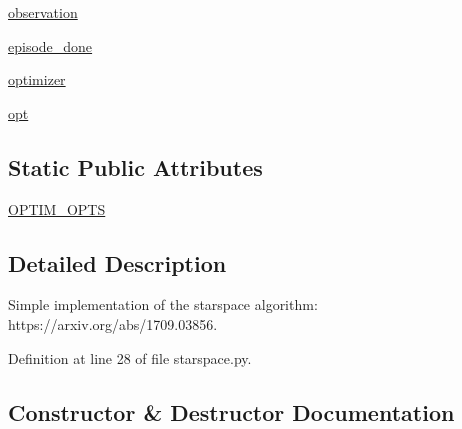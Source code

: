 \begin{DoxyCompactItemize}
\item 
\hyperlink{classparlai_1_1agents_1_1starspace_1_1starspace_1_1StarspaceAgent_a0ec7b24305a7ca5f0fd5a11cd6aa1fdc}{observation}
\item 
\hyperlink{classparlai_1_1agents_1_1starspace_1_1starspace_1_1StarspaceAgent_ad6565ef570b709afb46bf9a9b4bc59c3}{episode\+\_\+done}
\item 
\hyperlink{classparlai_1_1agents_1_1starspace_1_1starspace_1_1StarspaceAgent_afacbbd91785631f9b23fd0fbd9b4cc21}{optimizer}
\item 
\hyperlink{classparlai_1_1agents_1_1starspace_1_1starspace_1_1StarspaceAgent_aae476e9cdd8b9672ae6c28ef9400f09e}{opt}
\end{DoxyCompactItemize}
\subsection*{Static Public Attributes}
\begin{DoxyCompactItemize}
\item 
\hyperlink{classparlai_1_1agents_1_1starspace_1_1starspace_1_1StarspaceAgent_a7a9de321f7be5793fb4d0fdb4892b9dc}{O\+P\+T\+I\+M\+\_\+\+O\+P\+TS}
\end{DoxyCompactItemize}


\subsection{Detailed Description}
\begin{DoxyVerb}Simple implementation of the starspace algorithm: https://arxiv.org/abs/1709.03856.
\end{DoxyVerb}
 

Definition at line 28 of file starspace.\+py.



\subsection{Constructor \& Destructor Documentation}
\mbox{\label{classparlai_1_1agents_1_1starspace_1_1starspace_1_1StarspaceAgent_a6bdc1142c021946ee6cb409d4f9dc3c9}} 
